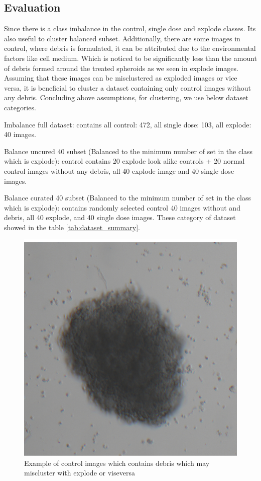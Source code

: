 \subsection{Evaluation}
Since there is a class imbalance in the control, single dose and explode classes. Its also useful to cluster balanced subset. Additionally, there are some images in control, where debris is formulated, it can be attributed due to the environmental factors like cell medium. Which is noticed to be significantly less than the amount of debris formed around the treated spheroids as we seen in explode images. Assuming that these images can be misclustered as exploded images or vice versa, it is beneficial to cluster a dataset containing only control images without any debris. Concluding above assumptions, for clustering, we use below dataset categories.

Imbalance full dataset: contains all control: 472, all single dose: 103, all explode: 40 images.

Balance uncured 40 subset (Balanced to the minimum number of set in the class which is explode): control contains 20 explode look alike controls + 20 normal control images without any debris, all 40 explode image and 40 single dose images.

Balance curated 40 subset  (Balanced to the minimum number of set in the class which is explode):
contains randomly selected control 40 images without and debris, all 40 explode, and 40 single dose images. These category of dataset showed in the table \ref{tab:dataset_summary}.

\begin{figure}[H]
    \centering
    \includegraphics[scale=0.25]{figures/controlex.png} 
    \caption{Example of control images which contains debris which may miscluster with explode or viseversa}
    \label{fig:controlex.png}
\end{figure}

